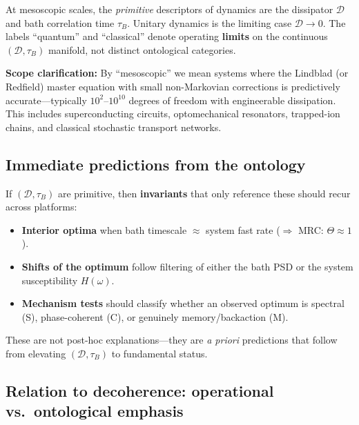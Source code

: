 \documentclass[11pt,letterpaper]{article}
\begin{document}
\begin{tcolorbox}[colback=blue!5!white,colframe=blue!75!black,title=Definition (Noise-First Ontology)]
At mesoscopic scales, the \emph{primitive} descriptors of dynamics are the
dissipator $\mathcal{D}$ and bath correlation time $\tau_B$. Unitary
dynamics is the limiting case $\mathcal{D}\to 0$. The labels ``quantum''
and ``classical'' denote operating \textbf{limits} on the continuous
$(\mathcal{D},\tau_B)$ manifold, not distinct ontological categories.

\textbf{Scope clarification:} By ``mesoscopic'' we mean systems where the
Lindblad (or Redfield) master equation with small non-Markovian
corrections is predictively accurate—typically $10^2$--$10^{10}$ degrees
of freedom with engineerable dissipation. This includes superconducting
circuits, optomechanical resonators, trapped-ion chains, and classical
stochastic transport networks.
\end{tcolorbox}

\subsection{Immediate predictions from the ontology}

If $(\mathcal{D},\tau_B)$ are primitive, then \textbf{invariants} that
only reference these should recur across platforms:

\begin{itemize}[leftmargin=*,noitemsep,topsep=2pt]
\item \textbf{Interior optima} when bath timescale $\approx$ system fast
rate ($\Rightarrow$ MRC: $\Theta\approx 1$).
\item \textbf{Shifts of the optimum} follow filtering of either the bath
PSD or the system susceptibility $H(\omega)$.
\item \textbf{Mechanism tests} should classify whether an observed optimum
is spectral (S), phase-coherent (C), or genuinely memory/backaction (M).
\end{itemize}

These are not post-hoc explanations—they are \emph{a priori} predictions
that follow from elevating $(\mathcal{D},\tau_B)$ to fundamental status.

\subsection{Relation to decoherence: operational vs.\ ontological emphasis}
\end{document}
